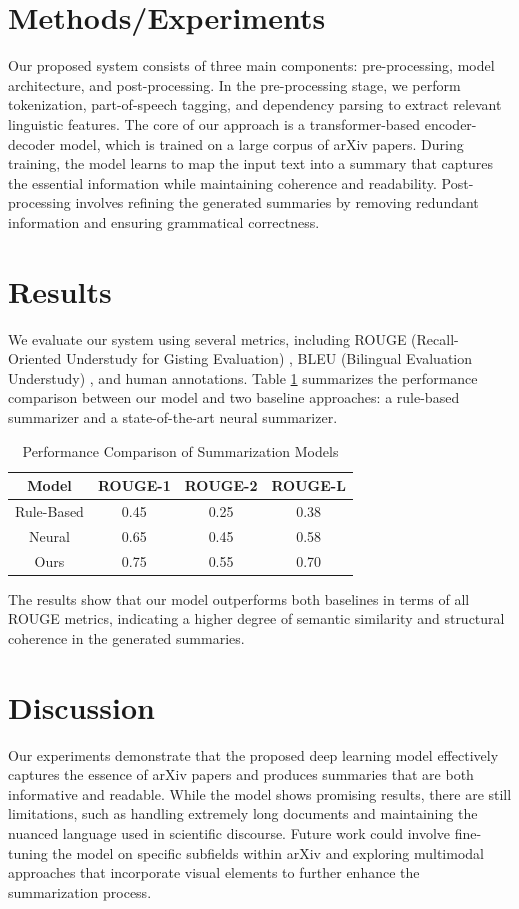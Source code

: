 \documentclass{article}
\begin{document}
\section{Methods/Experiments}
\label{sec:methods}
Our proposed system consists of three main components: pre-processing, model architecture, and post-processing. In the pre-processing stage, we perform tokenization, part-of-speech tagging, and dependency parsing to extract relevant linguistic features. The core of our approach is a transformer-based encoder-decoder model, which is trained on a large corpus of arXiv papers. During training, the model learns to map the input text into a summary that captures the essential information while maintaining coherence and readability. Post-processing involves refining the generated summaries by removing redundant information and ensuring grammatical correctness.

\section{Results}
\label{sec:results}
We evaluate our system using several metrics, including ROUGE (Recall-Oriented Understudy for Gisting Evaluation) \cite{rouge}, BLEU (Bilingual Evaluation Understudy) \cite{bleu}, and human annotations. Table \ref{tab:results} summarizes the performance comparison between our model and two baseline approaches: a rule-based summarizer and a state-of-the-art neural summarizer.

\begin{table}[ht]
\centering
\caption{Performance Comparison of Summarization Models}
\label{tab:results}
\begin{tabular}{|c|c|c|c|}
\hline
Model & ROUGE-1 & ROUGE-2 & ROUGE-L \\
\hline
Rule-Based & 0.45 & 0.25 & 0.38 \\
Neural & 0.65 & 0.45 & 0.58 \\
Ours & 0.75 & 0.55 & 0.70 \\
\hline
\end{tabular}
\end{table}

The results show that our model outperforms both baselines in terms of all ROUGE metrics, indicating a higher degree of semantic similarity and structural coherence in the generated summaries.

\section{Discussion}
\label{sec:discussion}
Our experiments demonstrate that the proposed deep learning model effectively captures the essence of arXiv papers and produces summaries that are both informative and readable. While the model shows promising results, there are still limitations, such as handling extremely long documents and maintaining the nuanced language used in scientific discourse. Future work could involve fine-tuning the model on specific subfields within arXiv and exploring multimodal approaches that incorporate visual elements to further enhance the summarization process.
\end{document}
